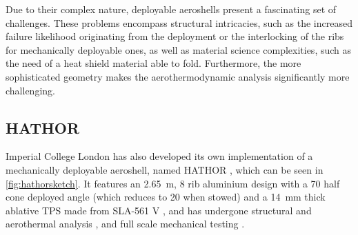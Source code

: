 Due to their complex nature, deployable aeroshells present a fascinating set of challenges. These problems encompass structural intricacies, such as the increased failure likelihood originating from the deployment or the interlocking of the ribs for mechanically deployable ones, as well as material science complexities, such as the need of a heat shield material able to fold. Furthermore, the more sophisticated geometry makes the aerothermodynamic analysis significantly more challenging.

\subsection{HATHOR}

Imperial College London has also developed its own implementation of a mechanically deployable aeroshell, named HATHOR \cite{hathordesign}, which can be seen in \autoref{fig:hathorsketch}. It features an \SI{2.65}{\m}, 8 rib aluminium design with a \SI{70}{\deg} half cone deployed angle (which reduces to \SI{20}{\deg} when stowed) \cite{hathordesign} and a \SI{14}{\mm} thick ablative TPS made from SLA-561 V \cite{hathoraero1}, and has undergone structural \cite{hathordesign} and aerothermal analysis \cite{hathoraero1}, and full scale mechanical testing \cite{hathorstructest}.

